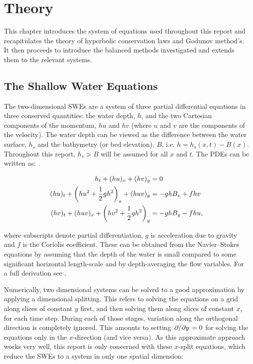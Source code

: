 \chapter{Theory}
\label{ch:theory}

This chapter introduces the system of equations used throughout this report and recapitulates the theory of hyperbolic conservation laws and Godunov method's. It then proceeds to introduce the balanced methods investigated and extends them to the relevant systems.

\section{The Shallow Water Equations}

The two-dimensional SWEs are a system of three partial differential equations in three conserved quantities: the water depth, $h$, and the two Cartesian components of the momentum, $hu$ and $hv$ (where $u$ and $v$ are the components of the velocity). The water depth can be viewed as the difference between the water surface, $h_s$ and the bathymetry (or bed elevation), $B$, i.e. $h = h_s(x,t) - B(x)$. Throughout this report, $h_s > B$ will be assumed for all $x$ and $t$. The PDEs can be written as:

\begin{subequations}
  \begin{align}
                            h_t + (hu)_x + (hv)_y & = 0 \\
    (hu)_t + \qty(hu^2 + \frac{1}{2}gh^2)_x + (huv)_y & = - ghB_x + fhv \\
    (hv)_t + (huv)_x + \qty(hv^2 + \frac{1}{2}gh^2)_y & = - ghB_y - fhu,
  \end{align}
\end{subequations}

where subscripts denote partial differentiation, $g$ is acceleration due to gravity and $f$ is the Coriolis coefficient. These can be obtained from the Navier--Stokes equations by assuming that the depth of the water is small compared to some significant horizontal length-scale and by depth-averaging the flow variables. For a full derivation see \citet{dellar2005shallow}.

Numerically, two dimensional systems can be solved to a good approximation by applying a dimensional splitting. This refers to solving the equations on a grid along slices of constant $y$ first, and then solving them along slices of constant $x$, for each time step. During each of those stages, variation along the orthogonal direction is completely ignored. This amounts to setting $\pdv*{y} = 0$ for solving the equations only in the $x$-direction (and vice versa). As this approximate approach works very well, this report is only concerned with these $x$-split equations, which reduce the SWEs to a system in only one spatial dimension:

